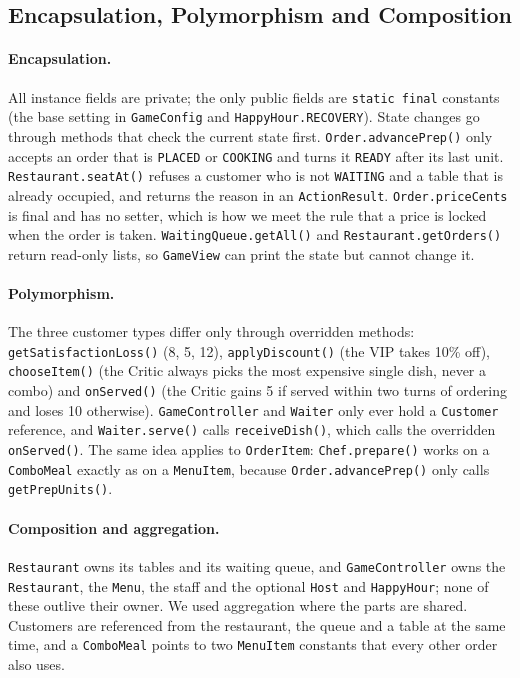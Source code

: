 \subsection{Encapsulation, Polymorphism and Composition}
\begin{sloppypar}

\paragraph{Encapsulation.} All instance fields are private; the only public fields are
\texttt{static final} constants (the base setting in \texttt{GameConfig} and
\texttt{HappyHour.RECOVERY}). State changes go through methods that check the current state first. \texttt{Order.advancePrep()} only accepts an order that is
\texttt{PLACED} or \texttt{COOKING} and turns it \texttt{READY} after its last unit.
\texttt{Restaurant.seatAt()} refuses a customer who is not \texttt{WAITING} and a table that is
already occupied, and returns the reason in an \texttt{ActionResult}. \texttt{Order.priceCents}
is final and has no setter, which is how we meet the rule that a price is locked when the order
is taken. \texttt{WaitingQueue.getAll()} and \texttt{Restaurant.getOrders()} return read-only
lists, so \texttt{GameView} can print the state but cannot change it.

\paragraph{Polymorphism.} The three customer types differ only through overridden methods:
\texttt{getSatisfactionLoss()} (8, 5, 12), \texttt{applyDiscount()} (the VIP takes 10\% off),
\texttt{chooseItem()} (the Critic always picks the most expensive single dish, never a combo)
and \texttt{onServed()} (the Critic gains 5 if served within two turns of ordering and loses 10
otherwise). \texttt{GameController} and \texttt{Waiter} only ever hold a \texttt{Customer}
reference, and \texttt{Waiter.serve()} calls \texttt{receiveDish()}, which calls the overridden
\texttt{onServed()}. The same idea applies to \texttt{OrderItem}: \texttt{Chef.prepare()} works on
a \texttt{ComboMeal} exactly as on a \texttt{MenuItem}, because \texttt{Order.advancePrep()} only
calls \texttt{getPrepUnits()}.

\paragraph{Composition and aggregation.} \texttt{Restaurant} owns its tables and its waiting
queue, and \texttt{GameController} owns the \texttt{Restaurant}, the \texttt{Menu}, the staff and
the optional \texttt{Host} and \texttt{HappyHour}; none of these outlive their owner. We used
aggregation where the parts are shared. Customers are referenced from the restaurant, the queue
and a table at the same time, and a \texttt{ComboMeal} points to two \texttt{MenuItem} constants
that every other order also uses.
\end{sloppypar}

